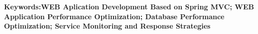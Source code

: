 \vskip12bp
{\xiaosi\heiti\noindent
\textbf{Keywords:\enskip WEB Aplication Development Based on Spring MVC; WEB Application Performance Optimization; Database Performance Optimization; Service Monitoring and Response Strategies}}
